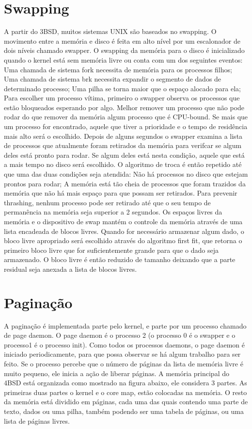 \section{Swapping}
A partir do 3BSD, muitos sistemas UNIX são baseados no swapping.
O movimento entre a memória e disco é feita em alto nível por um escalonador de dois níveis chamado swapper. O swapping da memória para o disco é inicializado quando o kernel está sem memória livre ou conta com um dos seguintes eventos:
Uma chamada de sistema fork necessita de memória para os processos filhos;
Uma chamada de sistema brk necessita expandir o segmento de dados de determinado processo;
Uma pilha se torna maior que o espaço alocado para ela;
Para escolher um processo vítima, primeiro o swapper observa os processos que estão bloqueados esperando por algo. Melhor remover um processo que não pode rodar do que remover da memória algum processo que é CPU-bound. Se mais que um processo for encontrado, aquele que tiver a prioridade e o tempo de residência mais alto será o escolhido.
Depois de alguns segundos o swapper examina a lista de processos que atualmente foram retirados da memória para verifcar se algum deles está pronto para rodar. Se algum deles está nesta condição, aquele que está a mais tempo no disco será escolhido. O algoritmo de troca é então repetido até que uma das duas condições seja atendida:
Não há processos no disco que estejam prontos para rodar;
A memória está tão cheia de processos que foram trazidos da memória que não há mais espaço para que possam ser retirados.
Para prevenir thrashing, nenhum processo pode ser retirado até que o seu tempo de permanência na memória seja superior a 2 segundos.
Os espaços livres da memória e o dispositivo de swap mantém o controle da memória através de uma lista encadeada de blocos livres. Quando for necessário armazenar algum dado, o bloco livre apropriado será escolhido através do algoritmo first fit, que retorna o primeiro bloco livre que for suficientemente grande para que o dado seja armazenado. O bloco livre é então reduzido de tamanho deixando que a parte residual seja anexada a lista de blocos livres.
\section{Paginação}
A paginação é implementada parte pelo kernel, e parte por um processo chamado de page daemon. O page daemon é o processo 2 (o processo 0 é o swapper e o processo1 é o processo init). Como todos os processos daemons, o page daemon é iniciado periodicamente, para que possa observar se há algum trabalho para ser feito. Se o processo percebe que o número de páginas da lista de memória livre é muito pequeno, ele inicia a ação de liberar páginas.
A memória principal do 4BSD está organizada como mostrado na figura abaixo, ele considera 3 partes. As primeiras duas partes o kernel e o core map, estão colocadas na memória. O resto da memória está dividido em páginas, cada uma das quais contendo uma parte de texto, dados ou uma pilha, também podendo ser uma tabela de páginas, ou uma lista de páginas livres.

